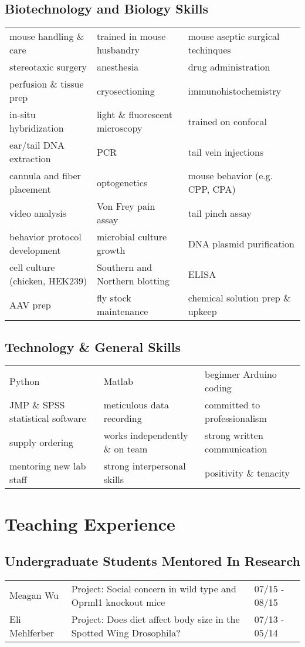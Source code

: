 \documentclass[letterpaper]{article}
\begin{document}
\subsection*{Biotechnology and Biology Skills}
\begin{tabular}{lll}
mouse handling \& care		& trained in mouse husbandry		& mouse aseptic surgical techinques \\
stereotaxic surgery 		& anesthesia 				& drug administration \\
perfusion \& tissue prep 	& cryosectioning 			& immunohistochemistry \\
in-situ hybridization		& light \& fluorescent microscopy	& trained on confocal \\
ear/tail DNA extraction 	& PCR	 				& tail vein injections \\
cannula and fiber placement 	& optogenetics 				& mouse behavior (e.g. CPP, CPA) \\
video analysis			& Von Frey pain assay	 		& tail pinch assay \\
behavior protocol development 	& microbial culture growth 		& DNA plasmid purification \\
cell culture (chicken, HEK239)	& Southern and Northern blotting	& ELISA \\
AAV prep			& fly stock maintenance 		& chemical solution prep \& upkeep \\
\end{tabular}

\subsection*{Technology \& General Skills}
\begin{tabular}{lll}
Python				& Matlab				& beginner Arduino coding \\
JMP \& SPSS statistical software& meticulous data recording		& committed to professionalism \\
supply ordering			& works independently \& on team	& strong written communication \\
mentoring new lab staff		& strong interpersonal skills 		& positivity \& tenacity \\
\end{tabular}

\section*{Teaching Experience}

\subsection*{Undergraduate Students Mentored In Research}
\begin{tabular}{lll}
Meagan Wu	& {Project: Social concern in wild type and Oprml1 knockout mice}	& {07/15 - 08/15} \\
Eli Mehlferber	& {Project: Does diet affect body size in the Spotted Wing Drosophila?}	& {07/13 - 05/14} \\
\end{tabular}
\end{document}
